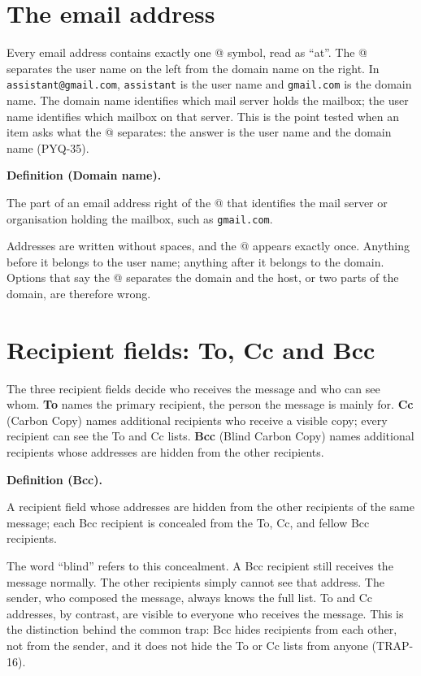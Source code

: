 \documentclass[11pt]{article}
\newenvironment{definitionbox}[1]{%
  \par\noindent\textbf{Definition (#1).}\ \itshape
}{\par\vspace{0.3em}}
\begin{document}
\section{The email address}
Every email address contains exactly one @ symbol, read as ``at''. The @
separates the user name on the left from the domain name on the right. In
\texttt{assistant@gmail.com}, \texttt{assistant} is the user name and
\texttt{gmail.com} is the domain name. The domain name identifies which mail
server holds the mailbox; the user name identifies which mailbox on that
server. This is the point tested when an item asks what the @ separates: the
answer is the user name and the domain name (PYQ-35).

\begin{definitionbox}{Domain name}
The part of an email address right of the @ that identifies the mail server or
organisation holding the mailbox, such as \texttt{gmail.com}.
\end{definitionbox}

Addresses are written without spaces, and the @ appears exactly once.
Anything before it belongs to the user name; anything after it belongs to the
domain. Options that say the @ separates the domain and the host, or two
parts of the domain, are therefore wrong.

\section{Recipient fields: To, Cc and Bcc}
The three recipient fields decide who receives the message and who can see
whom. \textbf{To} names the primary recipient, the person the message is
mainly for. \textbf{Cc} (Carbon Copy) names additional recipients who receive
a visible copy; every recipient can see the To and Cc lists. \textbf{Bcc}
(Blind Carbon Copy) names additional recipients whose addresses are hidden
from the other recipients.

\begin{definitionbox}{Bcc}
A recipient field whose addresses are hidden from the other recipients of the
same message; each Bcc recipient is concealed from the To, Cc, and fellow Bcc
recipients.
\end{definitionbox}

The word ``blind'' refers to this concealment. A Bcc recipient still receives
the message normally. The other recipients simply cannot see that address.
The sender, who composed the message, always knows the full list. To and Cc
addresses, by contrast, are visible to everyone who receives the message.
This is the distinction behind the common trap: Bcc hides recipients from each
other, not from the sender, and it does not hide the To or Cc lists from
anyone (TRAP-16).
\end{document}
